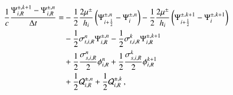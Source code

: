 \documentclass[preprint,12pt]{elsarticle}
\begin{document}
\begin{equation}\lequ{S2CNfullR}\begin{split}
  \frac{1}{c}\frac{\Psi\iR^{\pm,k+1}-\Psi\iR^{\pm,n}}{\dt} = &
  -\half\frac{2\mu^\pm}{h_i}\fn{\Psi^{\pm,n}_{i+\half} - \Psi^{\pm,n}_i}
  -\half\frac{2\mu^\pm}{h_i}\fn{\Psi^{\pm,k+1}_{i+\half} - \Psi^{\pm,k+1}_i}\\
  &-\half\sigma_{t,i,R}^n\Psi\iR^{\pm,n}
   -\half\sigma_{t,i,R}^k\Psi\iR^{\pm,k+1}\\
  &+\half\frac{\sigma_{s,i,R}^n}{2}\phi\iR^n
   +\half\frac{\sigma_{s,i,R}^k}{2}\phi\iR^{k+1}\\
  &+\half\Q_{i,R}^{\pm,n}
   +\half\Q_{i,R}^{\pm,k} \pec
\end{split}\end{equation}
\end{document}
